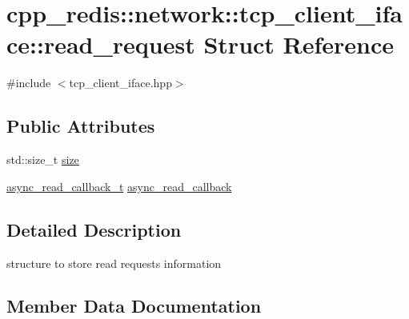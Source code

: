 \hypertarget{structcpp__redis_1_1network_1_1tcp__client__iface_1_1read__request}{}\section{cpp\+\_\+redis\+:\+:network\+:\+:tcp\+\_\+client\+\_\+iface\+:\+:read\+\_\+request Struct Reference}
\label{structcpp__redis_1_1network_1_1tcp__client__iface_1_1read__request}


{\ttfamily \#include $<$tcp\+\_\+client\+\_\+iface.\+hpp$>$}

\subsection*{Public Attributes}
\begin{DoxyCompactItemize}
\item 
std\+::size\+\_\+t \mbox{\hyperlink{structcpp__redis_1_1network_1_1tcp__client__iface_1_1read__request_a5ff8258391c9b3c8d2ce1a5c5a0304be}{size}}
\item 
\mbox{\hyperlink{classcpp__redis_1_1network_1_1tcp__client__iface_ae8bf79e8e1f1d7e359ed1c7cdc4026fc}{async\+\_\+read\+\_\+callback\+\_\+t}} \mbox{\hyperlink{structcpp__redis_1_1network_1_1tcp__client__iface_1_1read__request_a0584269b3a021d588e38948c12fa5292}{async\+\_\+read\+\_\+callback}}
\end{DoxyCompactItemize}


\subsection{Detailed Description}
structure to store read requests information 

\subsection{Member Data Documentation}
\mbox{\label{structcpp__redis_1_1network_1_1tcp__client__iface_1_1read__request_a0584269b3a021d588e38948c12fa5292}} 
